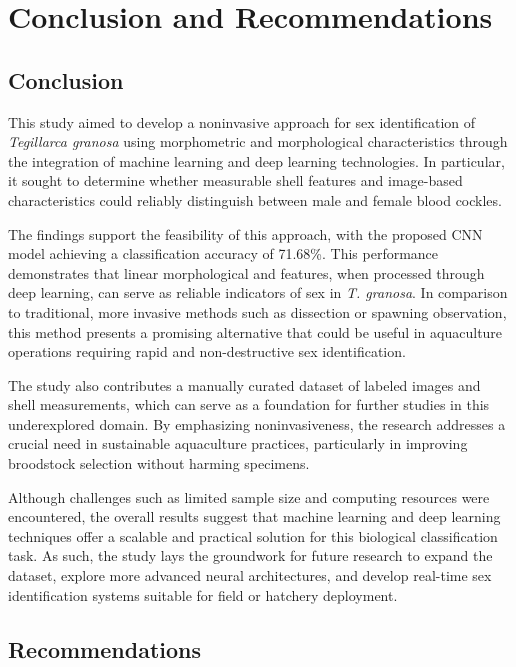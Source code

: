 \chapter{Conclusion and Recommendations}

\section{Conclusion}

This study aimed to develop a noninvasive approach for sex identification of \textit{Tegillarca granosa} using morphometric and morphological characteristics through the integration of machine learning and deep learning technologies. In particular, it sought to determine whether measurable shell features and image-based characteristics could reliably distinguish between male and female blood cockles.

The findings support the feasibility of this approach, with the proposed CNN model achieving a classification accuracy of 71.68\%. This performance demonstrates that linear morphological and features, when processed through deep learning, can serve as reliable indicators of sex in \textit{T. granosa}. In comparison to traditional, more invasive methods such as dissection or spawning observation, this method presents a promising alternative that could be useful in aquaculture operations requiring rapid and non-destructive sex identification.

The study also contributes a manually curated dataset of labeled images and shell measurements, which can serve as a foundation for further studies in this underexplored domain. By emphasizing noninvasiveness, the research addresses a crucial need in sustainable aquaculture practices, particularly in improving broodstock selection without harming specimens.

Although challenges such as limited sample size and computing resources were encountered, the overall results suggest that machine learning and deep learning techniques offer a scalable and practical solution for this biological classification task. As such, the study lays the groundwork for future research to expand the dataset, explore more advanced neural architectures, and develop real-time sex identification systems suitable for field or hatchery deployment.

\section{Recommendations}

